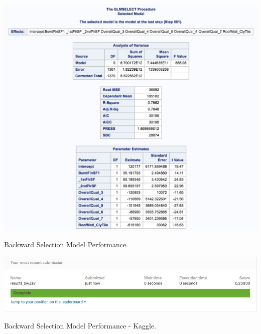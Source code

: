 \documentclass[11pt]{scrartcl} %
\begin{document}
\begin{table}[H] %
	\centering %
	\includegraphics[scale=.3]{../graphics/A2BWresults}
	\caption{Backward Selection Model Performance.}
	\label{tab:A2BWperf}
\end{table}
\hrulefill
\begin{table}[H] %
	\centering %
	\includegraphics[scale=.4]{../graphics/A2BWKaggle}
	\caption{Backward Selection Model Performance - Kaggle.}
	\label{tab:A2BWKaggle}
\end{table}
\hrulefill
\end{document}
